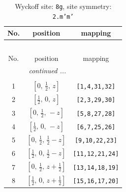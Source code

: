 \documentclass[fleqn,8pt]{jsarticle}
\begin{document}
\begin{longtable}{ccc}
\caption{Wyckoff site: {\tt 8g}, site symmetry: {\tt 2.m'm'}}
 \\
 \hline \hline
No. & position & mapping \\ \hline \endfirsthead

\multicolumn{2}{l}{\tablename\ \thetable{}} \\
 \hline \hline
No. & position & mapping \\ \hline \endhead

 \hline \hline
\multicolumn{2}{r}{\footnotesize\it continued ...} \\ \endfoot

 \hline \hline
\multicolumn{2}{r}{} \\ \endlastfoot

1 & $\left[ 0,\, \frac{1}{2},\, z \right]$ & {\tt [1,4,31,32]} \\ \hline
2 & $\left[ \frac{1}{2},\, 0,\, z \right]$ & {\tt [2,3,29,30]} \\ \hline
3 & $\left[ 0,\, \frac{1}{2},\, - z \right]$ & {\tt [5,8,27,28]} \\ \hline
4 & $\left[ \frac{1}{2},\, 0,\, - z \right]$ & {\tt [6,7,25,26]} \\ \hline
5 & $\left[ 0,\, \frac{1}{2},\, \frac{1}{2} - z \right]$ & {\tt [9,10,22,23]} \\ \hline
6 & $\left[ \frac{1}{2},\, 0,\, \frac{1}{2} - z \right]$ & {\tt [11,12,21,24]} \\ \hline
7 & $\left[ 0,\, \frac{1}{2},\, z + \frac{1}{2} \right]$ & {\tt [13,14,18,19]} \\ \hline
8 & $\left[ \frac{1}{2},\, 0,\, z + \frac{1}{2} \right]$ & {\tt [15,16,17,20]} \\
\end{longtable}
\renewcommand{\arraystretch}{1.2}
\end{document}
